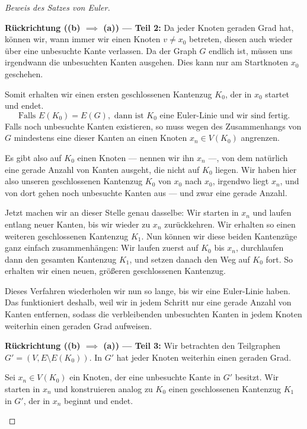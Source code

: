\begin{proof}[Beweis des Satzes von Euler]
\begin{math-stroke}
\textbf{Rückrichtung (\texorpdfstring{\textbf{(b)} $\implies$ \textbf{(a)}}{b -> a}) --- Teil 2:}
Da jeder Knoten geraden Grad hat, können wir, wann immer wir einen Knoten $v \neq x_0$ betreten, diesen auch wieder über eine unbesuchte Kante verlassen. Da der Graph $G$ endlich ist, müssen uns irgendwann die unbesuchten Kanten ausgehen. Dies kann nur am Startknoten $x_0$ geschehen. 

Somit erhalten wir einen ersten geschlossenen Kantenzug $K_0$, der in $x_0$ startet und endet.
\[
\text{Falls } E(K_0) = E(G), \text{ dann ist } K_0 \text{ eine Euler-Linie und wir sind fertig.}
\]
Falls noch unbesuchte Kanten existieren, so muss wegen des Zusammenhangs von $G$ mindestens eine dieser Kanten an einen Knoten $x_n \in V(K_0)$ angrenzen.
\end{math-stroke}

\begin{spoken-clean}[00:15:10 - 00:17:28]
Es gibt also auf $K_0$ einen Knoten --- nennen wir ihn $x_n$ ---, von dem natürlich eine gerade Anzahl von Kanten ausgeht, die nicht auf $K_0$ liegen. Wir haben hier also unseren geschlossenen Kantenzug $K_0$ von $x_0$ nach $x_0$, irgendwo liegt $x_n$, und von dort gehen noch unbesuchte Kanten aus --- und zwar eine gerade Anzahl.

Jetzt machen wir an dieser Stelle genau dasselbe: Wir starten in $x_n$ und laufen entlang neuer Kanten, bis wir wieder zu $x_n$ zurückkehren. Wir erhalten so einen weiteren geschlossenen Kantenzug $K_1$. Nun können wir diese beiden Kantenzüge ganz einfach zusammenhängen: Wir laufen zuerst auf $K_0$ bis $x_n$, durchlaufen dann den gesamten Kantenzug $K_1$, und setzen danach den Weg auf $K_0$ fort. So erhalten wir einen neuen, größeren geschlossenen Kantenzug.

Dieses Verfahren wiederholen wir nun so lange, bis wir eine Euler-Linie haben. Das funktioniert deshalb, weil wir in jedem Schritt nur eine gerade Anzahl von Kanten entfernen, sodass die verbleibenden unbesuchten Kanten in jedem Knoten weiterhin einen geraden Grad aufweisen.
\end{spoken-clean}

\begin{math-stroke}
\textbf{Rückrichtung (\texorpdfstring{\textbf{(b)} $\implies$ \textbf{(a)}}{b -> a}) --- Teil 3:}
Wir betrachten den Teilgraphen $G' = (V, E \setminus E(K_0))$. In $G'$ hat jeder Knoten weiterhin einen geraden Grad. 

Sei $x_n \in V(K_0)$ ein Knoten, der eine unbesuchte Kante in $G'$ besitzt. Wir starten in $x_n$ und konstruieren analog zu $K_0$ einen geschlossenen Kantenzug $K_1$ in $G'$, der in $x_n$ beginnt und endet.


\end{math-stroke}
\end{proof}
